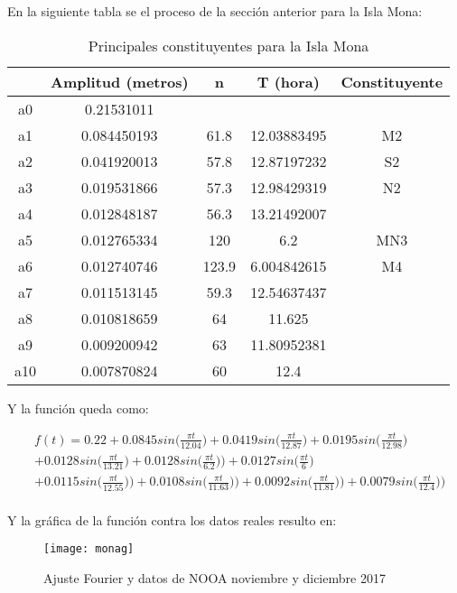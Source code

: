 \documentclass[12pt,letterpaper]{article}
\begin{document}
En la siguiente tabla se el proceso de la sección anterior para la Isla Mona:

\begin{table}[H]
\centering
\begin{tabular}{|c|c c c c|}
\hline
	&	Amplitud (metros)	&	n	&	T (hora)	&	Constituyente	\\
    \hline

a0	&	0.21531011	&		&		&		\\
a1	&	0.084450193	&	61.8	&	12.03883495	&	M2	\\
a2	&	0.041920013	&	57.8	&	12.87197232	&	S2	\\
a3	&	0.019531866	&	57.3	&	12.98429319	&	N2	\\
a4	&	0.012848187	&	56.3	&	13.21492007	&		\\
a5	&	0.012765334	&	120	&	6.2	&	MN3	\\
a6	&	0.012740746	&	123.9	&	6.004842615	&	M4	\\
a7	&	0.011513145	&	59.3	&	12.54637437	&		\\
a8	&	0.010818659	&	64	&	11.625	&		\\
a9	&	0.009200942	&	63	&	11.80952381	&		\\
a10	&	0.007870824	&	60	&	12.4	&		\\


\hline
\end{tabular}
\caption{Principales constituyentes para la Isla Mona}
\end{table}

Y la función queda como:

\begin{equation}
 \begin{split}
& f(t) = 0.22 + 0.0845sin\bigg(\frac{\pi t}{12.04}\bigg) + 0.0419sin\bigg(\frac{\pi t}{12.87}\bigg) + 0.0195sin\bigg(\frac{\pi t}{12.98}\bigg)  \\
& + 0.0128sin\bigg(\frac{\pi t}{13.21}\bigg) + 0.0128sin\bigg(\frac{\pi t}{6.2}\bigg)) + 0.0127sin\bigg(\frac{\pi t}{6}\bigg)  \\
& + 0.0115sin\bigg(\frac{\pi t}{12.55}\bigg))
+ 0.0108sin\bigg(\frac{\pi t}{11.63}\bigg)) + 0.0092sin\bigg(\frac{\pi t}{11.81}\bigg)) + 0.0079sin\bigg(\frac{\pi t}{12.4}\bigg)) \\
\end{split}
\end{equation}

Y la gráfica de la función contra los datos reales resulto en:

\begin{figure}[H]
	\centering	\texttt{[image: monag]}
	\caption{Ajuste Fourier y datos de NOOA noviembre y diciembre 2017}
\end{figure}
\end{document}
